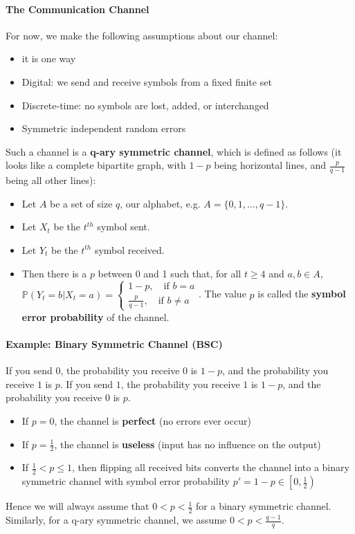 \documentclass[10pt,letter]{article}
\theoremstyle{plain}
\theoremstyle{definition}
\begin{document}
\paragraph{The Communication Channel}
For now, we make the following assumptions about our channel: 
\begin{itemize}
    \item it is one way
    \item Digital: we send and receive symbols from a fixed finite set 
    \item Discrete-time: no symbols are lost, added, or interchanged 
    \item Symmetric independent random errors 
\end{itemize}
Such a channel is a \textbf{q-ary symmetric channel}, which is defined as follows (it looks like a complete bipartite graph, with $1-p$ being horizontal lines, and $\frac{p}{q-1}$ being all other lines): 
\begin{itemize}
    \item Let $A$ be a set of size $q$, our alphabet, e.g. $A=\{0,1,\ldots,q-1\}$.
    \item Let $X_t$ be the $t^{th}$ symbol sent.
    \item Let $Y_t$ be the $t^{th}$ symbol received. 
    \item Then there is a $p$ between 0 and 1 such that, for all $t\geq4$ and $a,b\in A$, $\mathbb{P}(Y_t=b|X_t=a)=\begin{cases}1-p, \quad\text{if } b=a \\ \frac{p}{q-1},\quad\text{if } b\neq a\end{cases}$. The value $p$ is called the \textbf{symbol error probability} of the channel. 
\end{itemize}  

\paragraph{Example: Binary Symmetric Channel (BSC)}
If you send $0$, the probability you receive $0$ is $1-p$, and the probability you receive $1$ is $p$. If you send $1$, the probability you receive $1$ is $1-p$, and the probability you receive $0$ is $p$.
\begin{itemize}
    \item If $p=0$, the channel is \textbf{perfect} (no errors ever occur)
    \item If $p=\frac{1}{2}$, the channel is \textbf{useless} (input has no influence on the output)
    \item If $\frac{1}{2}<p\leq1$, then flipping all received bits converts the channel into a binary symmetric channel with symbol error probability $p'=1-p\in\left[0,\frac{1}{2}\right)$ 
\end{itemize}
Hence we will always assume that $0<p<\frac{1}{2}$ for a binary symmetric channel. Similarly, for a q-ary symmetric channel, we assume $0<p<\frac{q-1}{q}$. 
\end{document}
